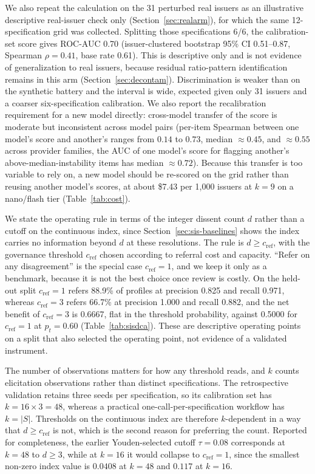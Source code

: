 \documentclass[a4paper,fleqn]{cas-sc}
\begin{document}
We also repeat the calculation on the 31 perturbed real issuers as an illustrative descriptive real-issuer check only (Section~\ref{sec:realarm}), for which the same 12-specification
grid was collected. Splitting those specifications 6/6, the calibration-set score gives ROC-AUC 0.70 (issuer-clustered bootstrap 95\% CI 0.51--0.87, Spearman $\rho=0.41$, base rate 0.61). This is descriptive only and is not evidence of generalization to real issuers, because residual ratio-pattern identification remains in this arm (Section~\ref{sec:decontam}). Discrimination is weaker than on the synthetic battery
and the interval is wide, expected given only 31 issuers and a coarser six-specification
calibration. 
 We also
report the recalibration requirement for a new model directly: cross-model transfer of the score is
moderate but inconsistent across model pairs (per-item Spearman between one model's score and another's
ranges from $0.14$ to $0.73$, median $\approx0.45$, and $\approx0.55$ across provider families, the AUC of
one model's score for flagging another's above-median-instability items has median $\approx0.72$). Because
this transfer is too variable to rely on, a new model should be re-scored on the grid rather than reusing
another model's scores, at about \$7.43 per 1{,}000 issuers at $k=9$ on a
nano/flash tier (Table~\ref{tab:cost}).

We state the operating rule in terms of the integer dissent count $d$ rather than a cutoff on the
continuous index, since Section~\ref{sec:sis-baselines} shows the index carries no information
beyond $d$ at these resolutions. The rule is $d\ge c_{\mathrm{ref}}$, with the governance threshold $c_{\mathrm{ref}}$ chosen
according to referral cost and capacity. ``Refer on any disagreement'' is the special case $c_{\mathrm{ref}}=1$,
and we keep it only as a benchmark, because it is not the best choice once review is costly. On the
held-out split $c_{\mathrm{ref}}=1$ refers 88.9\% of profiles at precision 0.825 and recall 0.971, whereas $c_{\mathrm{ref}}=3$
refers 66.7\% at precision 1.000 and recall 0.882, and the net benefit of $c_{\mathrm{ref}}=3$ is 0.6667, flat in the
threshold probability, against 0.5000 for $c_{\mathrm{ref}}=1$ at $p_t=0.60$ (Table~\ref{tab:sisdca}). These are
descriptive operating points on a split that also selected the operating point, not evidence of a
validated instrument.

The number of observations matters for how any threshold reads, and $k$ counts elicitation
observations rather than distinct specifications. The retrospective validation retains three seeds
per specification, so its calibration set has $k=16\times3=48$, whereas a practical
one-call-per-specification workflow has $k=|S|$. Thresholds on the continuous index are therefore
$k$-dependent in a way that $d\ge c_{\mathrm{ref}}$ is not, which is the second reason for preferring the count.
Reported for completeness, the earlier Youden-selected cutoff $\tau=0.08$ corresponds at $k=48$ to
$d\ge3$, while at $k=16$ it would collapse to $c_{\mathrm{ref}}=1$, since the smallest non-zero index value is
$0.0408$ at $k=48$ and $0.117$ at $k=16$.
\end{document}
